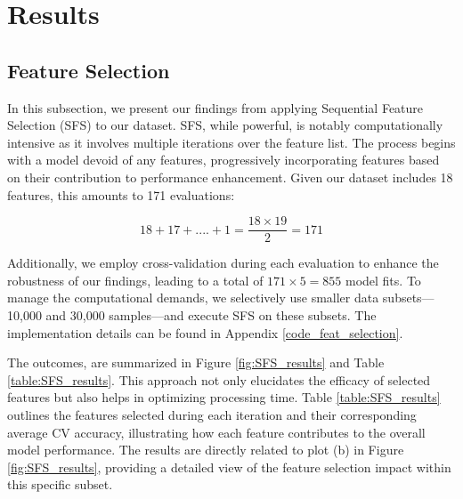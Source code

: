 \documentclass[]{article}
\begin{document}




\clearpage
\section{Results}



\subsection{Feature Selection}


In this subsection, we present our findings from applying Sequential Feature Selection (SFS) to our dataset. SFS, while powerful, is notably computationally intensive as it involves multiple iterations over the feature list. The process begins with a model devoid of any features, progressively incorporating features based on their contribution to performance enhancement. Given our dataset includes 18 features, this amounts to 171 evaluations:

$$18 + 17 + ....  + 1 = \frac{18 \times 19}{2} = 171 $$

Additionally, we employ cross-validation during each evaluation to enhance the robustness of our findings, leading to a total of 
$171 \times 5 =855$ model fits. To manage the computational demands, we selectively use smaller data subsets—10,000 and 30,000 samples—and execute SFS on these subsets. The implementation details can be found in Appendix \ref{code_feat_selection}. 

The outcomes, are summarized in Figure \ref{fig:SFS_results} and Table \ref{table:SFS_results}. This approach not only elucidates the efficacy of selected features but also helps in optimizing processing time.  Table \ref{table:SFS_results} outlines the features selected during each iteration and their corresponding average CV accuracy, illustrating how each feature contributes to the overall model performance. The results are directly related to plot (b) in Figure \ref{fig:SFS_results}, providing a detailed view of the feature selection impact within this specific subset.
\end{document}
